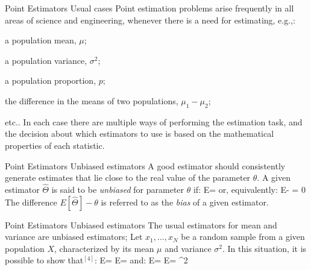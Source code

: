 \documentclass[t]{beamer}
\begin{document}

\begin{ftst}
{Point Estimators}
{Usual cases}
Point estimation problems arise frequently in all areas of science and engineering, whenever there is a need for estimating, e.g.,:

\bitems a population  mean, $\mu$;
	\item a population variance, $\sigma^2$;
	\item a population proportion, $p$;
	\item the difference in the means of two populations, $\mu_1-\mu_2$; 
	\item etc..
\eitem
\vhalf
In each case there are multiple ways of performing the estimation task, and the decision about which estimators to use is based on the mathematical properties of each statistic.
\end{ftst}


\begin{ftst}
{Point Estimators}
{Unbiased estimators}
A good estimator should consistently generate estimates that lie close to the real value of the parameter $\theta$.
\vone
A given estimator $\hat{\Theta}$ is said to be \textit{unbiased} for parameter $\theta$ if:
\beqs
E\left[\hat{\Theta}\right] = \theta
\eqs
\noindent or, equivalently:
\beqs
E\left[\hat{\Theta}\right] - \theta = 0
\eqs
\vone
The difference $E\left[\hat{\Theta}\right] - \theta$ is referred to as the \textit{bias} of a given estimator.
\end{ftst}


\begin{ftst}
{Point Estimators}
{Unbiased estimators}
The usual estimators for mean and variance are unbiased estimators;
\vone
Let $x_1,\ldots,x_N$ be a random sample from a given population $X$, characterized by its mean $\mu$ and variance $\sigma^2$. In this situation, it is possible to show that$^{[4]}$:
\beqs
E = E\left[\frac{1}{N}\sum\limits_{i=1}^{N}x_i\right] = \mu
\eqs
\noindent and:
\beqs
E\left[s^2\right] = E\left[\frac{1}{N-1}\sum\limits_{i=1}^{N}\left(x_i-\bar{x}\right)^2\right] = \sigma^2
\eqs
{}
\end{ftst}

\end{document}
